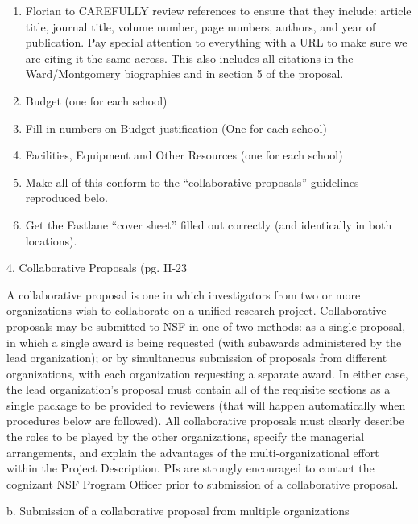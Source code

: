 \documentclass[pdftex,12pt,fullpage,oneside]{amsart}
\begin{document}
\begin{enumerate}
\item Florian to CAREFULLY review references to ensure that they include: article title,
  journal title, volume number, page numbers, authors, and year of
  publication.  Pay special attention to everything with a URL to make
  sure we are citing it the same across.  This also includes all
  citations in the Ward/Montgomery biographies and in section 5 of the proposal.
\item Budget (one for each school) 
\item Fill in numbers on Budget justification (One for each school)
\item Facilities, Equipment and Other Resources (one for each school)
\item Make all of this conform to the ``collaborative proposals''
  guidelines reproduced belo.
\item Get the Fastlane ``cover sheet'' filled out correctly (and identically in
  both locations).
\end{enumerate}



4. Collaborative Proposals  (pg. II-23

A collaborative proposal is one in which investigators from two or
more organizations wish to collaborate on a unified research project.
Collaborative proposals may be submitted to NSF in one of two methods:
as a single proposal, in which a single award is being requested (with
subawards administered by the lead organization); or by simultaneous
submission of proposals from different organizations, with each
organization requesting a separate award.  In either case, the lead
organization’s proposal must contain all of the requisite sections as
a single package to be provided to reviewers (that will happen
automatically when procedures below are followed).  All collaborative
proposals must clearly describe the roles to be played by the other
organizations, specify the managerial arrangements, and explain the
advantages of the multi-organizational effort within the Project
Description.  PIs are strongly encouraged to contact the cognizant NSF
Program Officer prior to submission of a collaborative proposal.


 b. Submission of a collaborative proposal from multiple organizations
\end{document}
